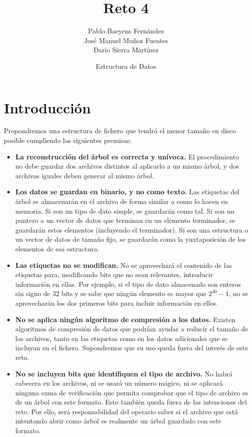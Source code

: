 \documentclass{article}
\title{Reto 4}
\date{Estructura de Datos}
\author{Pablo Baeyens Fernández\\José Manuel Muñoz Fuentes\\Darío Sierra Martínez}
\begin{document}
\maketitle

\section{Introducción}


Propondremos una estructura de fichero que tendrá el menor tamaño en disco posible cumpliendo las siguientes premisas:
\begin{itemize}
	\item \textbf{La reconstrucción del árbol es correcta y unívoca.} El procedimiento no debe guardar dos archivos distintos al aplicarlo a un mismo árbol, y dos archivos iguales deben generar al mismo árbol.
	\item \textbf{Los datos se guardan en binario, y no como texto.} Las etiquetas del árbol se almacenarán en el archivo de forma similar a como lo hacen en memoria. Si son un tipo de dato simple, se guardarán como tal. Si son un puntero a un vector de datos que terminan en un elemento terminador, se guardarán estos elementos (incluyendo el terminador). Si son una estructura o un vector de datos de tamaño fijo, se guardarán como la yuxtaposición de los elementos de esa estructura.
	\item \textbf{Las etiquetas no se modifican.} No se aprovechará el contenido de las etiquetas para, modificando bits que no sean relevantes, introducir información en ellas. Por ejemplo, si el tipo de dato almacenado son enteros sin signo de $32$ bits y se sabe que ningún elemento es mayor que $2^{30}-1$, no se aprovecharán los dos primeros bits para incluir información en ellos.
	\item \textbf{No se aplica ningún algoritmo de compresión a los datos.} Existen algoritmos de compresión de datos que podrían ayudar a reducir el tamaño de los archivos, tanto en las etiquetas como en los datos adicionales que se incluyan en el fichero. Supondremos que su uso queda fuera del interés de este reto.
	\item \textbf{No se incluyen bits que identifiquen el tipo de archivo.} No habrá cabecera en los archivos, ni se usará un número mágico, ni se aplicará ninguna suma de verificación que permita comprobar que el tipo de archivo es de un árbol con este formato. Esto también queda fuera de las intenciones del reto. Por ello, será responsabilidad del operario saber si el archivo que está intentando abrir como árbol es realmente un árbol guardado con este formato.
\end{itemize}
\end{document}

